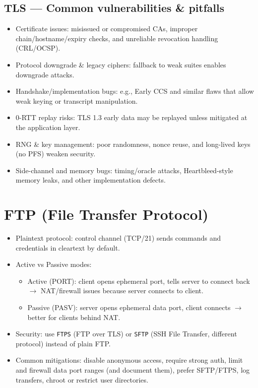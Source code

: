 \documentclass[12pt]{article}
\begin{document}
\subsection{TLS --- Common vulnerabilities \& pitfalls}
\begin{itemize}
  \item Certificate issues: misissued or compromised CAs, improper chain/hostname/expiry checks, and unreliable revocation handling (CRL/OCSP).
  \item Protocol downgrade \& legacy ciphers: fallback to weak suites enables downgrade attacks.
  \item Handshake/implementation bugs: e.g., Early CCS and similar flaws that allow weak keying or transcript manipulation.
  \item 0-RTT replay risks: TLS 1.3 early data may be replayed unless mitigated at the application layer.
  \item RNG \& key management: poor randomness, nonce reuse, and long-lived keys (no PFS) weaken security.
  \item Side-channel and memory bugs: timing/oracle attacks, Heartbleed-style memory leaks, and other implementation defects.
\end{itemize}

\section{FTP (File Transfer Protocol)}
\begin{itemize}
  \item Plaintext protocol: control channel (TCP/21) sends commands and credentials in cleartext by default.
  \item Active vs Passive modes:
    \begin{itemize}
      \item Active (PORT): client opens ephemeral port, tells server to connect back $\to$ NAT/firewall issues because server connects to client.
      \item Passive (PASV): server opens ephemeral data port, client connects $\to$ better for clients behind NAT.
    \end{itemize}
  \item Security: use \texttt{FTPS} (FTP over TLS) or \texttt{SFTP} (SSH File Transfer, different protocol) instead of plain FTP.
  \item Common mitigations: disable anonymous access, require strong auth, limit and firewall data port ranges (and document them), prefer SFTP/FTPS, log transfers, chroot or restrict user directories.
\end{itemize}
\end{document}
